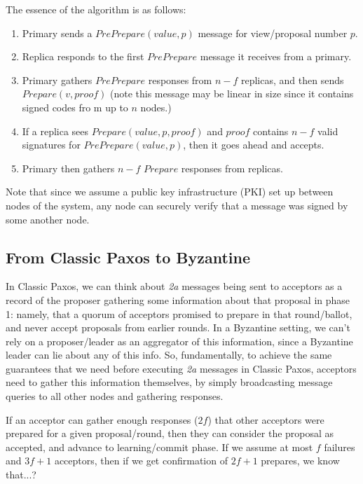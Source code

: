 \documentclass[10pt,a4paper]{article}
\begin{document}

The essence of the algorithm is as follows:
\begin{enumerate}
    \item Primary sends a $PrePrepare(value, p)$ message for view/proposal number $p$.
    \item Replica responds to the first $PrePrepare$ message it receives from a primary.
    \item Primary gathers $PrePrepare$ responses from $n-f$ replicas, and then sends $Prepare(v, proof)$ (note this message may be linear in size since it contains signed codes fro   m up to $n$ nodes.)
    \item If a replica sees $Prepare(value, p, proof)$ and $proof$ contains $n-f$ valid signatures for $PrePrepare(value, p)$, then it goes ahead and accepts.
    \item Primary then gathers $n-f$ $Prepare$ responses from replicas.
\end{enumerate}
Note that since we assume a public key infrastructure (PKI) set up between nodes of the system, any node can securely verify that a message was signed by some another node.

\subsection*{From Classic Paxos to Byzantine}

In Classic Paxos, we can think about \textit{2a} messages being sent to acceptors as a record of the proposer gathering some information about that proposal in phase 1: namely, that a quorum of acceptors promised to prepare in that round/ballot, and never accept proposals from earlier rounds. In a Byzantine setting, we can't rely on a proposer/leader as an aggregator of this information, since a Byzantine leader can lie about any of this info. So, fundamentally, to achieve the same guarantees that we need before executing \textit{2a} messages in Classic Paxos, acceptors need to gather this information themselves, by simply broadcasting message queries to all other nodes and gathering responses. 

If an acceptor can gather enough responses ($2f$) that other acceptors were prepared for a given proposal/round, then they can consider the proposal as accepted, and advance to learning/commit phase. If we assume at most $f$ failures and $3f+1$ acceptors, then if we get confirmation of $2f+1$ prepares, we know that...?
\end{document}
